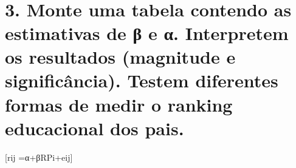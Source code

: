 \documentclass[11pt]{article}
\begin{document}
    \begin{center}
    \end{center}
    { \hspace*{\fill} \\}
    
    \section{3. Monte uma tabela contendo as estimativas de β e α.
Interpretem os resultados (magnitude e significância). Testem diferentes
formas de medir o ranking educacional dos
pais.}\label{monte-uma-tabela-contendo-as-estimativas-de-ux3b2-e-ux3b1.-interpretem-os-resultados-magnitude-e-significuxe2ncia.-testem-diferentes-formas-de-medir-o-ranking-educacional-dos-pais.}

{[}rij =α+βRPi+eij{]}
\end{document}
